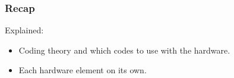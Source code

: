 \documentclass{beamer}
\begin{document}
	\begin{frame}\frametitle{Recap}

%
%
%
%
%
%
%
%
%


		
		\noindent
		\begin{minipage}{.5\linewidth}
			Explained: 

			\begin{itemize}

				\item Coding theory and which codes to use with the hardware.

				\item Each hardware element on its own.


\end{itemize}
\end{minipage}
\end{frame}
\end{document}
